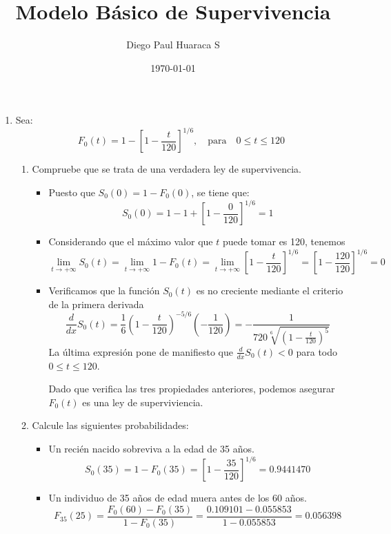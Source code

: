 \documentclass[12pt,a4paper,oneside]{article}\usepackage[]{graphicx}\usepackage[]{color}
\title{\bf Modelo Básico de Supervivencia}
\author{Diego Paul Huaraca S}
\date{\today}
\begin{document}
\maketitle

\begin{enumerate}
\item Sea:
\[F_0(t) = 1- \left[1-\frac{t}{120}\right]^{1/6}, \quad \text{para} \quad 0\leq t \leq 120 \]
\begin{enumerate}
      \item Compruebe que se trata de una verdadera ley de supervivencia.
      \begin{itemize}
            \item Puesto que $S_0(0)=1-F_0(0)$, se tiene que:
            \[S_0(0)=1-1+\left[1-\frac{0}{120}\right]^{1/6}=1\]
            
            \item Considerando que el máximo valor que $t$ puede tomar es 120, tenemos
            \[\lim_{t\to +\infty} S_0(t)=\lim_{t\to +\infty} 1-F_0(t) = \lim_{t\to +\infty} \left[1-\frac{t}{120}\right]^{1/6}=\left[1-\frac{120}{120}\right]^{1/6}=0\]
            
            \item Verificamos que la función $S_0(t)$ es no creciente mediante el criterio de la primera derivada
            \[\frac{d}{dx}S_0(t)=\frac{1}{6}\left(1-\frac{t}{120}\right)^{-5/6}\left(-\frac{1}{120}\right) = -\frac{1}{720\sqrt[6]{\left(1-\frac{t}{120}\right)^5}}\]
            La última expresión pone de manifiesto que $\frac{d}{dx}S_0(t)<0$ para todo $0\leq t \leq 120$.\newline
            
            Dado que verifica las tres propiedades anteriores, podemos asegurar $F_0(t)$ es una ley de superviviencia.
      \end{itemize}
      
      \item Calcule las siguientes probabilidades:
      \begin{itemize}
            \item Un recién nacido sobreviva a la edad de 35 años.
            \[S_0(35)=1-F_0(35)=\left[1-\frac{35}{120}\right]^{1/6}=0.9441470\]
            
            \item Un individuo de 35 años de edad muera antes de los 60 años.
            \[F_{35}(25)=\frac{F_0(60)-F_0(35)}{1-F_0(35)}=\frac{0.109101-0.055853}{1-0.055853}=0.056398\]
            

\end{itemize}
\end{enumerate}
\end{enumerate}
\end{document}
